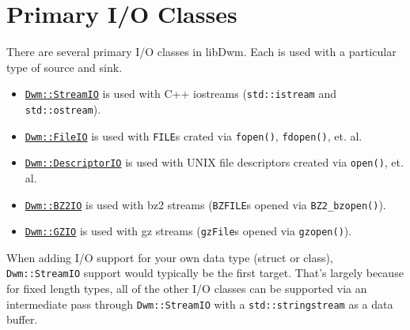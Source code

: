 \chapter{Primary I/O Classes}\label{chapter:primaryIOClasses}
There are several primary I/O classes in libDwm.  Each is used with
a particular type of source and sink.

\begin{minipage}{\textwidth}
\begin{itemize}[noitemsep,nolistsep]
\item[] \hyperref[section:DwmStreamIOClass]{\texttt{Dwm::StreamIO}} is used
  with C++ iostreams (\texttt{std::istream} and \texttt{std::ostream}).
\item[] \hyperref[section:DwmFileIOClass]{\texttt{Dwm::FileIO}} is used
  with \texttt{FILE}s crated via \texttt{fopen()}, \texttt{fdopen()}, et. al.
\item[] \hyperref[section:DwmDescriptorIOClass]{\texttt{Dwm::DescriptorIO}}
  is used with UNIX file descriptors created via \texttt{open()}, et. al.
\item[] \hyperref[section:DwmBZ2IOClass]{\texttt{Dwm::BZ2IO}}
  is used with bz2 streams (\texttt{BZFILE}s opened via
  \texttt{BZ2\_bzopen()}).
\item[] \hyperref[section:DwmGZIOClass]{\texttt{Dwm::GZIO}}
  is used with gz streams (\texttt{gzFile}s opened via
  \texttt{gzopen()}).
\end{itemize}
\vspace{1em}

When adding I/O support for your own data type (struct or class),
\texttt{Dwm::StreamIO} support would typically be the first target.
That's largely because for fixed length types, all of the other
I/O classes can be supported via an intermediate pass through
\texttt{Dwm::StreamIO} with a \texttt{std::stringstream} as a
data buffer.

\end{minipage}


